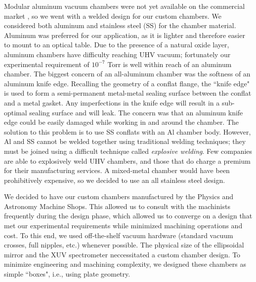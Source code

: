 Modular aluminum vacuum chambers were not yet available on the commercial market \cite{piperAndrewPiperDissertation}, so we went with a welded design for our custom chambers. We considered both aluminum and stainless steel (SS) for the chamber material. Aluminum was preferred for our application, as it is lighter and therefore easier to mount to an optical table. Due to the presence of a natural oxide layer, aluminum chambers have difficulty reaching UHV vacuum; fortunately our experimental requirement of $10^{-7}$ Torr is well within reach of an aluminum chamber. The biggest concern of an all-aluminum chamber was the softness of an aluminum knife edge. Recalling the geometry of a conflat flange, the ``knife edge" is used to form a semi-permanent metal-metal sealing surface between the conflat and a metal gasket. Any imperfections in the knife edge will result in a sub-optimal sealing surface and will leak. The concern was that an aluminum knife edge could be easily damaged while working in and around the chamber. The solution to this problem is to use SS conflats with an Al chamber body. However, Al and SS cannot be welded together using traditional welding techniques; they must be joined using a difficult technique called \textit{explosive welding}. Few companies are able to explosively weld UHV chambers, and those that do charge a premium for their manufacturing services. A mixed-metal chamber would have been prohibitively expensive, so we decided to use an all stainless steel design.

We decided to have our custom chambers manufactured by the Physics and Astronomy Machine Shops. This allowed us to consult with the machinists frequently during the design phase, which allowed us to converge on a design that met our experimental requirements while minimized machining operations and cost. To this end, we used off-the-shelf vacuum hardware (standard vacuum crosses, full nipples, etc.) whenever possible. The physical size of the ellipsoidal mirror and the XUV spectrometer neccessitated a custom chamber design. To minimize engineering and machining complexity, we designed these chambers as simple ``boxes", i.e., using plate geometry.



